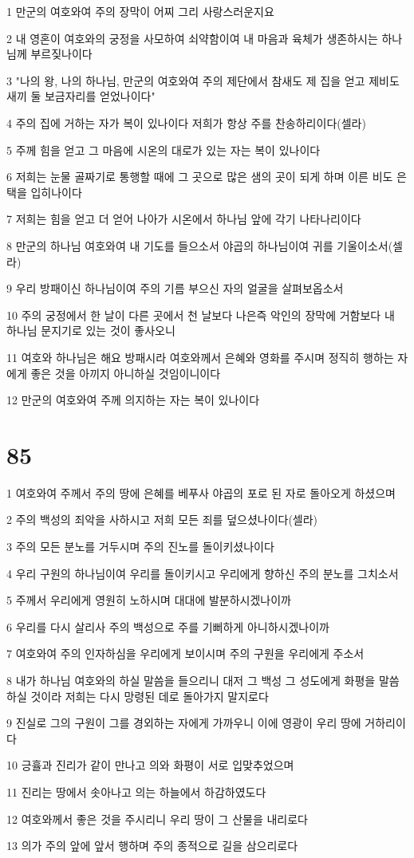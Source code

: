 \par 1 만군의 여호와여 주의 장막이 어찌 그리 사랑스러운지요
\par 2 내 영혼이 여호와의 궁정을 사모하여 쇠약함이여 내 마음과 육체가 생존하시는 하나님께 부르짖나이다
\par 3 "나의 왕, 나의 하나님, 만군의 여호와여 주의 제단에서 참새도 제 집을 얻고 제비도 새끼 둘 보금자리를 얻었나이다"
\par 4 주의 집에 거하는 자가 복이 있나이다 저희가 항상 주를 찬송하리이다(셀라)
\par 5 주께 힘을 얻고 그 마음에 시온의 대로가 있는 자는 복이 있나이다
\par 6 저희는 눈물 골짜기로 통행할 때에 그 곳으로 많은 샘의 곳이 되게 하며 이른 비도 은택을 입히나이다
\par 7 저희는 힘을 얻고 더 얻어 나아가 시온에서 하나님 앞에 각기 나타나리이다
\par 8 만군의 하나님 여호와여 내 기도를 들으소서 야곱의 하나님이여 귀를 기울이소서(셀라)
\par 9 우리 방패이신 하나님이여 주의 기름 부으신 자의 얼굴을 살펴보옵소서
\par 10 주의 궁정에서 한 날이 다른 곳에서 천 날보다 나은즉 악인의 장막에 거함보다 내 하나님 문지기로 있는 것이 좋사오니
\par 11 여호와 하나님은 해요 방패시라 여호와께서 은혜와 영화를 주시며 정직히 행하는 자에게 좋은 것을 아끼지 아니하실 것임이니이다
\par 12 만군의 여호와여 주께 의지하는 자는 복이 있나이다

\chapter{85}

\par 1 여호와여 주께서 주의 땅에 은혜를 베푸사 야곱의 포로 된 자로 돌아오게 하셨으며
\par 2 주의 백성의 죄악을 사하시고 저희 모든 죄를 덮으셨나이다(셀라)
\par 3 주의 모든 분노를 거두시며 주의 진노를 돌이키셨나이다
\par 4 우리 구원의 하나님이여 우리를 돌이키시고 우리에게 향하신 주의 분노를 그치소서
\par 5 주께서 우리에게 영원히 노하시며 대대에 발분하시겠나이까
\par 6 우리를 다시 살리사 주의 백성으로 주를 기뻐하게 아니하시겠나이까
\par 7 여호와여 주의 인자하심을 우리에게 보이시며 주의 구원을 우리에게 주소서
\par 8 내가 하나님 여호와의 하실 말씀을 들으리니 대저 그 백성 그 성도에게 화평을 말씀하실 것이라 저희는 다시 망령된 데로 돌아가지 말지로다
\par 9 진실로 그의 구원이 그를 경외하는 자에게 가까우니 이에 영광이 우리 땅에 거하리이다
\par 10 긍휼과 진리가 같이 만나고 의와 화평이 서로 입맞추었으며
\par 11 진리는 땅에서 솟아나고 의는 하늘에서 하감하였도다
\par 12 여호와께서 좋은 것을 주시리니 우리 땅이 그 산물을 내리로다
\par 13 의가 주의 앞에 앞서 행하며 주의 종적으로 길을 삼으리로다


